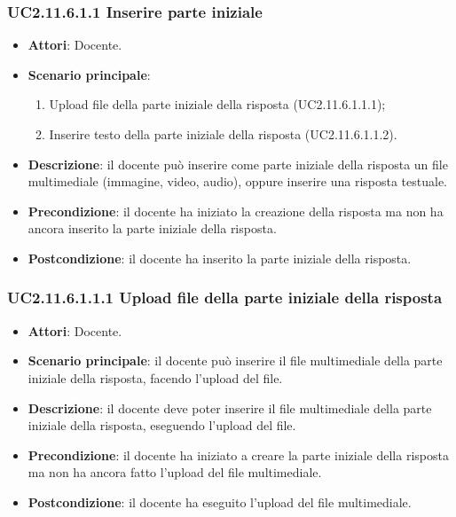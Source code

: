\subsubsection{UC2.11.6.1.1 Inserire parte iniziale}
\begin{itemize}
\item \textbf{Attori}: Docente.
\item \textbf{Scenario principale}:
\begin{enumerate}
\item Upload file della parte iniziale della risposta (UC2.11.6.1.1.1);
\item Inserire testo della parte iniziale della risposta (UC2.11.6.1.1.2).
\end{enumerate}
\item \textbf{Descrizione}: il docente può inserire come parte iniziale della risposta un file multimediale (immagine, video, audio), oppure inserire una risposta testuale.
\item \textbf{Precondizione}: il docente ha iniziato la creazione della risposta ma non ha ancora inserito la parte iniziale della risposta.
\item \textbf{Postcondizione}: il docente ha inserito la parte iniziale della risposta.
\end{itemize}
\subsubsection{UC2.11.6.1.1.1 Upload file della parte iniziale della risposta}
\begin{itemize}
\item \textbf{Attori}: Docente.
\item \textbf{Scenario principale}: il docente può inserire il file multimediale della parte iniziale della risposta, facendo l'upload del file.
\item \textbf{Descrizione}: il docente deve poter inserire il file multimediale della parte iniziale della risposta, eseguendo l'upload del file.
\item \textbf{Precondizione}: il docente ha iniziato a creare la parte iniziale della risposta ma non ha ancora fatto l'upload del file multimediale.
\item \textbf{Postcondizione}: il docente ha eseguito l'upload del file multimediale.
\end{itemize}
